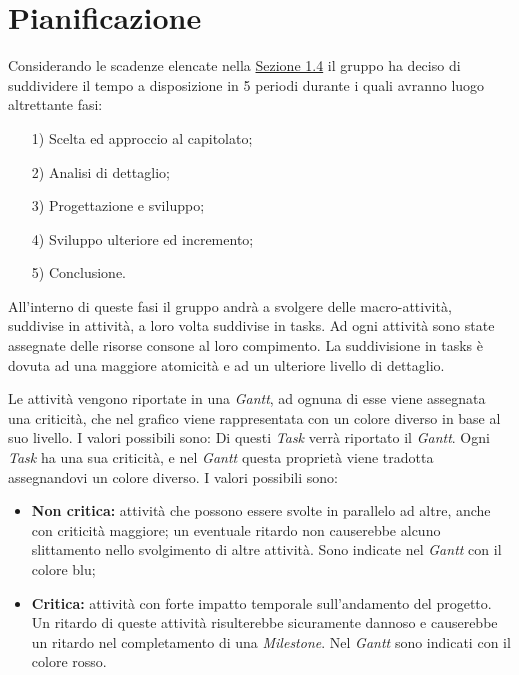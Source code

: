 \documentclass[a4paper]{article}
\begin{document}
				
				
	
	\newpage 
	\section{Pianificazione}
	
		Considerando le scadenze elencate nella \hyperref[Scadenze]{Sezione 1.4} il gruppo ha deciso di suddividere il tempo a disposizione in 5 
		periodi durante i quali avranno luogo altrettante fasi: 
		\begin{itemize}
			\item[1)] Scelta ed approccio al capitolato;
			\item[2)] Analisi di dettaglio;
			\item[3)] Progettazione e sviluppo;
			\item[4)] Sviluppo ulteriore ed incremento;
			\item[5)] Conclusione.
		\end{itemize}
		All'interno di queste fasi il gruppo andrà a svolgere delle macro-attività, suddivise in attività, a loro volta suddivise 
		in tasks. Ad ogni attività sono state assegnate delle risorse consone al loro compimento. La suddivisione in tasks è dovuta 
		ad una maggiore atomicità e ad un ulteriore livello di dettaglio.
		
		Le attività vengono riportate in una \emph{Gantt}, ad ognuna di esse viene assegnata una criticità, che nel grafico 
		viene rappresentata con un colore diverso in base al suo livello. I valori possibili sono:
		Di questi \emph{Task} verrà riportato il \emph{Gantt}. Ogni \emph{Task} ha una sua criticità, 
		e nel \emph{Gantt} questa proprietà viene tradotta assegnandovi un colore diverso. I valori possibili sono:
		\begin{itemize}
			\item \textbf{Non critica:} attività che possono essere svolte in parallelo ad altre, anche con criticità maggiore;
			un eventuale ritardo non causerebbe alcuno slittamento nello svolgimento di altre attività. Sono indicate nel 
			\emph{Gantt} con il colore blu;
			\item \textbf{Critica:} attività con forte impatto temporale sull'andamento del progetto. Un ritardo di queste
			attività risulterebbe sicuramente dannoso e causerebbe un ritardo nel completamento di una \emph{Milestone}. 
			Nel \emph{Gantt} sono indicati con il colore rosso.
		\end{itemize}
		
\end{document}

